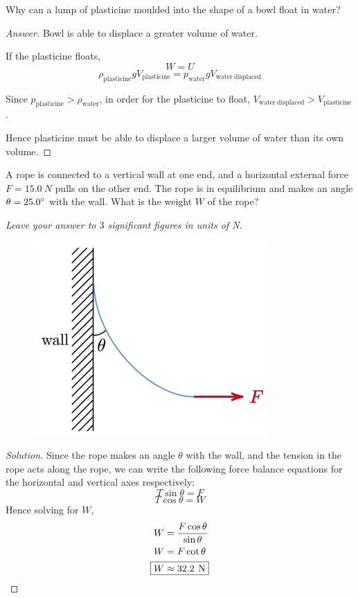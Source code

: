 \begin{prbm}
Why can a lump of plasticine moulded into the shape of a bowl float in water?
\end{prbm}
\begin{proof}[Answer]
Bowl is able to displace a greater volume of water.

If the plasticine floats, 
\[ W = U \]
\[ \rho_{\mathrm{plasticine}} g V_{\mathrm{plasticine}} = p_{\mathrm{water}} g V_{\mathrm{water\:displaced}} \]

Since $p_{\mathrm{plasticine}} > \rho_{\mathrm{water}}$, in order for the plasticine to float, $V_{\mathrm{water\:displaced}} > V_{\mathrm{plasticine}}$.

Hence plasticine must be able to displace a larger volume of water than its own volume.
\end{proof}
\pagebreak

\begin{prbm}
A rope is connected to a vertical wall at one end, and a horizontal external force $F=15.0\:\unit{N}$ pulls on the other end. The rope is in equilibrium and makes an angle $\theta = 25.0\degree$ with the wall. What is the weight $W$ of the rope? 

\textit{Leave your answer to $3$ significant figures in units of \emph{N}}.

\begin{figure}[H]
    \centering
    \includegraphics{images/Mysterious_Rope.png}
\end{figure}
\end{prbm}

\begin{proof}[Solution]
Since the rope makes an angle $\theta$ with the wall, and the tension in the rope acts along the rope, we can write the following force balance equations for the horizontal and vertical axes respectively:
\[ T \sin \theta = F \]
\[ T \cos \theta = W \]
Hence solving for $W$,
\begin{align*}
W &= \frac{F \cos \theta}{\sin \theta} \\
W &= F \cot \theta \\
\Aboxed{W &\approx 32.2\:\unit{N}}
\end{align*}
\end{proof}
\pagebreak

